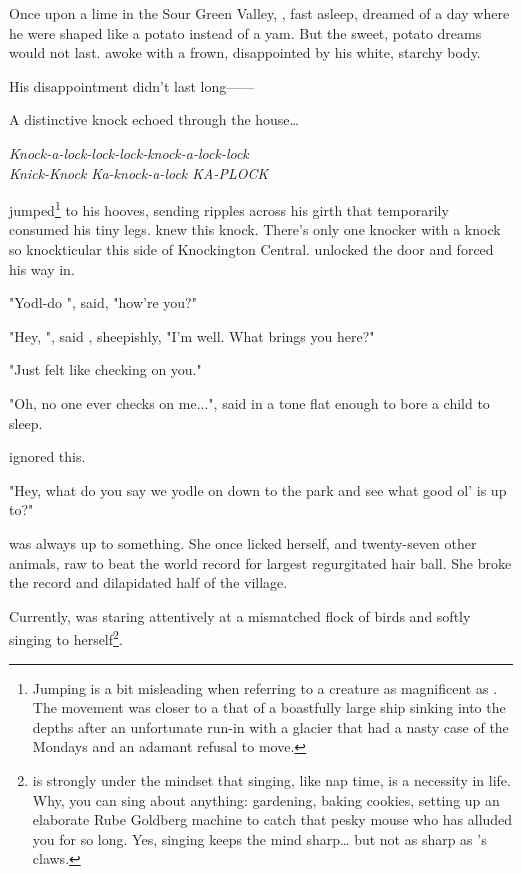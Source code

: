 \noindent
Once upon a lime in the Sour Green Valley, \uglyF{}, fast asleep, dreamed of a day
where he were shaped like a potato instead of a yam.  But the sweet, potato dreams
would not last.  \ugly{} awoke with a frown, disappointed by his white, starchy body.
\VV


\noindent
His disappointment didn't last long------

\noindent
A distinctive knock echoed through the house\ldots{}
\VV

\doublenewpage
\textit{Knock-a-lock-lock-lock-knock-a-lock-lock} \\\indent
\textit{Knick-Knock Ka-knock-a-lock KA-\large{}PLOCK\normalsize}
\VV


\noindent
\ugly{} jumped\footnote{
Jumping is a bit misleading when referring to a creature as magnificent as \ugly{}.
The movement was closer to a that of a boastfully large ship sinking into the depths after an unfortunate
run-in with a glacier that had a nasty case of the Mondays and an adamant refusal to move.
}
to his hooves, sending ripples across his girth that temporarily consumed his tiny legs.
\ugly{} knew this knock.  There's only one knocker with a knock so knockticular this side of Knockington Central.
\uglyF{} unlocked the door and \yoloF{} forced his way in.
\VV


"Yodl-do \ugly{}", \yolo{} said, "how're you?"
\vv

"Hey, \yolo{}", said \ugly{}, sheepishly, "I'm well.  What brings you here?"
\vv

"Just felt like checking on you."
\vv

"Oh, no one ever checks on me...",
said \ugly{} in a tone flat enough to bore a child to sleep.
\VV


\noindent
\yolo{} ignored this.
\VV


"Hey, what do you say we yodle on down to the park and see what good ol' \pixel{} is up to?"
\VV


\noindent
\pixelF{} was always up to something.
She once licked herself, and twenty-seven other animals, raw to beat the world record for largest
regurgitated hair ball.  She broke the record and dilapidated half of the village.
\VV


\noindent
Currently, \pixel{} was staring attentively at a mismatched flock of birds and
softly singing to herself\footnote{
\pixel{} is strongly under the mindset that singing, like nap time, is a necessity
in life. Why, you can sing about anything: gardening, baking cookies, setting
up an elaborate Rube Goldberg machine to catch that pesky mouse who has alluded you
for so long.  Yes, singing keeps the mind sharp\ldots{} but not as sharp as \pixel's
claws.
}.
\VV


